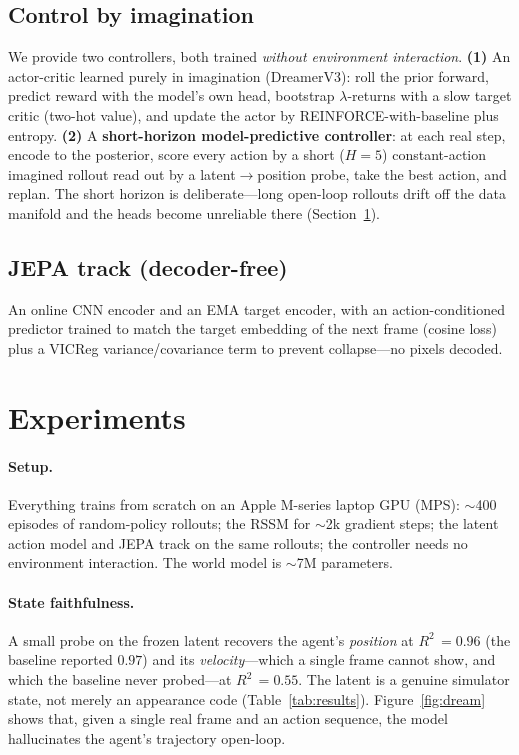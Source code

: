 \documentclass[11pt]{article}
\newcommand{\rtwo}{$R^2$}
\begin{document}
\subsection{Control by imagination}
We provide two controllers, both trained \emph{without environment interaction}.
\textbf{(1)} An actor-critic learned purely in imagination (DreamerV3): roll the
prior forward, predict reward with the model's own head, bootstrap $\lambda$-returns
with a slow target critic (two-hot value), and update the actor by
REINFORCE-with-baseline plus entropy. \textbf{(2)} A \textbf{short-horizon
model-predictive controller}: at each real step, encode to the posterior, score
every action by a short ($H{=}5$) constant-action imagined rollout read out by a
latent$\to$position probe, take the best action, and replan. The short horizon is
deliberate---long open-loop rollouts drift off the data manifold and the heads
become unreliable there (Section~\ref{sec:exp}).

\subsection{JEPA track (decoder-free)}
An online CNN encoder and an EMA target encoder, with an action-conditioned
predictor trained to match the target embedding of the next frame (cosine loss)
plus a VICReg variance/covariance term to prevent collapse---no pixels decoded.

\section{Experiments}
\label{sec:exp}

\paragraph{Setup.} Everything trains from scratch on an Apple M-series laptop GPU
(MPS): $\sim$400 episodes of random-policy rollouts; the RSSM for $\sim$2k gradient
steps; the latent action model and JEPA track on the same rollouts; the controller
needs no environment interaction. The world model is $\sim$7M parameters.

\paragraph{State faithfulness.} A small probe on the frozen latent recovers the
agent's \emph{position} at \rtwo\,$=0.96$ (the baseline reported $0.97$) and its
\emph{velocity}---which a single frame cannot show, and which the baseline never
probed---at \rtwo\,$=0.55$. The latent is a genuine simulator state, not merely an
appearance code (Table~\ref{tab:results}). Figure~\ref{fig:dream} shows that, given
a single real frame and an action sequence, the model hallucinates the agent's
trajectory open-loop.
\end{document}

